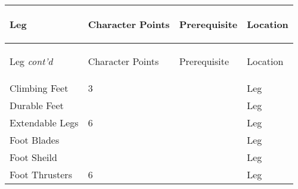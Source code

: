 \documentclass[twoside]{book}
\begin{document}
\begin{longtable}{p{1.25in}p{2em}ll} 
  Leg
  &
  \begin{turn}{70}{Character Points}\end{turn}
          
  &
  \begin{turn}{70}{Prerequisite}\end{turn}
          
  &
  \begin{turn}{70}{Location}\end{turn}
          
  \\
  \hline
  \hline
  \endfirsthead
  Leg \textit{cont'd}
        
  &
  \begin{turn}{70}{Character Points}\end{turn}
          
  &
  \begin{turn}{70}{Prerequisite}\end{turn}
          
  &
  \begin{turn}{70}{Location}\end{turn}
          
  \\
  \endhead
      
  \raggedright
           Climbing Feet 
  &
   3 
  &
  
  &
   Leg 
  \tabularnewline
  \hline
      
  \raggedright
           Durable Feet 
  &
  
  &
  
  &
   Leg 
  \tabularnewline
  \hline
      
  \raggedright
           Extendable Legs 
  &
   6 
  &
  
  &
   Leg 
  \tabularnewline
  \hline
      
  \raggedright
           Foot Blades 
  &
  
  &
  
  &
   Leg 
  \tabularnewline
  \hline
      
  \raggedright
           Foot Sheild 
  &
  
  &
  
  &
   Leg 
  \tabularnewline
  \hline
      
  \raggedright
           Foot Thrusters 
  &
   6 
  &
  
  &
   Leg 
  \tabularnewline
  \hline
      

\end{longtable}
\end{document}
